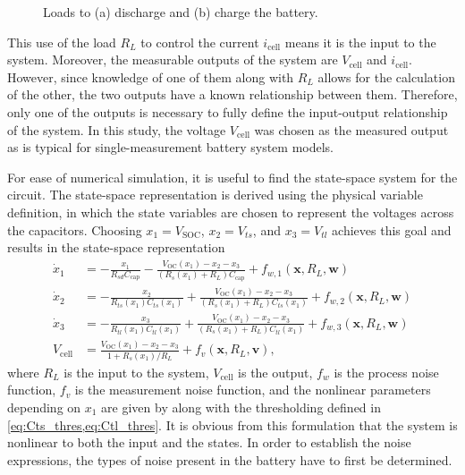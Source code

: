 \documentclass[../zhang_thesis.tex]{subfiles}
\begin{document}
\begin{figure}[ht]
\centering
\begin{subfigure}[c]{0.4\textwidth}
    \centering
\end{subfigure}
\begin{subfigure}[c]{0.55\textwidth}
    \centering
\end{subfigure}
\caption{Loads to (a) discharge and (b) charge the battery.}
\label{fig:batt_loads}
\end{figure}

This use of the load $R_L$ to control the current $i_\text{cell}$ means it is the input to the system. Moreover, the measurable outputs of the system are $V_\text{cell}$ and $i_\text{cell}$. However, since knowledge of one of them along with $R_L$ allows for the calculation of the other, the two outputs have a known relationship between them. Therefore, only one of the outputs is necessary to fully define the input-output relationship of the system. In this study, the voltage
$V_\text{cell}$ was chosen as the measured output as is typical for single-measurement battery system models.

For ease of numerical simulation, it is useful to find the state-space system for the circuit. The state-space representation is derived using the physical variable definition, in which the state variables are chosen to represent the voltages across the capacitors. Choosing $x_1=V_\text{SOC}$, $x_2=V_{ts}$, and $x_3=V_{tl}$ achieves this goal and results in the state-space representation
\begin{align}
    \dot{x}_1 &= - \frac{x_1}{R_{sd}C_\text{cap}} - \frac{V_\text{OC}(x_1)-x_2-x_3}{(R_s(x_1)+R_L)C_\text{cap}} + f_{w,1}(\mathbf{x},R_L,\mathbf{w}) \\
    \dot{x}_2 &= - \frac{x_2}{R_{ts}(x_1)C_{ts}(x_1)} + \frac{V_\text{OC}(x_1) - x_2 - x_3}{(R_s(x_1)+R_L)C_{ts}(x_1)} + f_{w,2}(\mathbf{x},R_L,\mathbf{w}) \\
    \dot{x}_3 &= - \frac{x_3}{R_{tl}(x_1)C_{tl}(x_1)} + \frac{V_\text{OC}(x_1) - x_2 - x_3}{(R_s(x_1)+R_L)C_{tl}(x_1)} + f_{w,3}(\mathbf{x},R_L,\mathbf{w}) \\
    V_\text{cell} &= \frac{V_\text{OC}(x_1) - x_2 - x_3}{1+R_s(x_1)/R_L} + f_v(\mathbf{x},R_L,\mathbf{v}),
\end{align}
where $R_L$ is the input to the system, $V_\text{cell}$ is the output, $f_w$ is the process noise function, $f_v$ is the measurement noise function, and the nonlinear parameters depending on $x_1$ are given by  along with the thresholding defined in \cref{eq:Cts_thres,eq:Ctl_thres}. It is obvious from this formulation that the system is nonlinear to both the input and the states. In order to establish the noise expressions, the types of
noise present in the battery have to first be determined.
\end{document}
